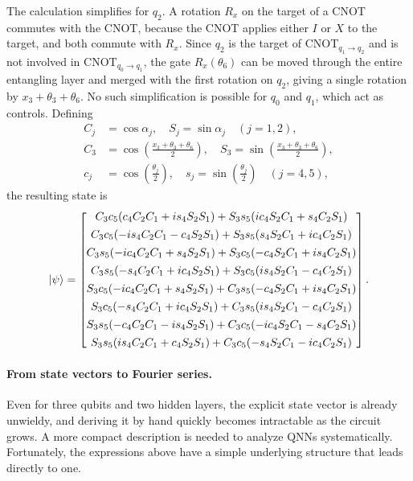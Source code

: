 \documentclass[12pt]{article}
\numberwithin{equation}{section}  %
\begin{document}
The calculation simplifies for $q_2$. A rotation $R_x$ on the target of a CNOT commutes with the CNOT, because the CNOT applies either $I$ or $X$ to the target, and both commute with $R_x$. Since $q_2$ is the target of $\mathrm{CNOT}_{q_1 \to q_2}$ and is not involved in $\mathrm{CNOT}_{q_0 \to q_1}$, the gate $R_x(\theta_6)$ can be moved through the entire entangling layer and merged with the first rotation on $q_2$, giving a single rotation by $x_3 + \theta_3 + \theta_6$. No such simplification is possible for $q_0$ and $q_1$, which act as controls. Defining
\begin{equation}
\begin{aligned}
C_j &= \cos\alpha_j, \quad S_j = \sin\alpha_j \quad (j = 1, 2), \\
C_3 &= \cos\!\left(\frac{x_3 + \theta_3 + \theta_6}{2}\right), \quad S_3 = \sin\!\left(\frac{x_3 + \theta_3 + \theta_6}{2}\right), \\
c_j &= \cos\!\left(\frac{\theta_j}{2}\right), \quad s_j = \sin\!\left(\frac{\theta_j}{2}\right) \quad (j = 4, 5),
\end{aligned}
\end{equation}
the resulting state is
\begin{equation}
\ket{\psi} =
\begin{bmatrix}
C_3c_5(c_4C_2C_1+is_4S_2S_1)+S_3s_5(ic_4S_2C_1+s_4C_2S_1)\\[4pt]
C_3c_5(-is_4C_2C_1-c_4S_2S_1)+S_3s_5(s_4S_2C_1+ic_4C_2S_1)\\[4pt]
C_3s_5(-ic_4C_2C_1+s_4S_2S_1)+S_3c_5(-c_4S_2C_1+is_4C_2S_1)\\[4pt]
C_3s_5(-s_4C_2C_1+ic_4S_2S_1)+S_3c_5(is_4S_2C_1-c_4C_2S_1)\\[4pt]
S_3c_5(-ic_4C_2C_1+s_4S_2S_1)+C_3s_5(-c_4S_2C_1+is_4C_2S_1)\\[4pt]
S_3c_5(-s_4C_2C_1+ic_4S_2S_1)+C_3s_5(is_4S_2C_1-c_4C_2S_1)\\[4pt]
S_3s_5(-c_4C_2C_1-is_4S_2S_1)+C_3c_5(-ic_4S_2C_1-s_4C_2S_1)\\[4pt]
S_3s_5(is_4C_2C_1+c_4S_2S_1)+C_3c_5(-s_4S_2C_1-ic_4C_2S_1)
\end{bmatrix}.
\label{eq:statevector3}
\end{equation}

\paragraph{From state vectors to Fourier series.} Even for three qubits and two hidden layers, the explicit state vector is already unwieldy, and deriving it by hand quickly becomes intractable as the circuit grows. A more compact description is needed to analyze QNNs systematically. Fortunately, the expressions above have a simple underlying structure that leads directly to one.
\end{document}
